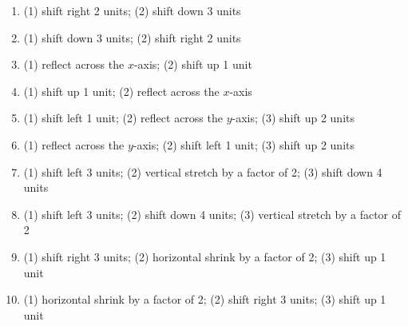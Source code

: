 \documentclass{ximera}
\begin{document}
\begin{enumerate}
\setcounter{enumi}{\value{HW}}


\item  (1) shift right 2 units; (2) shift down 3 units

\item  (1) shift down 3 units; (2) shift right 2 units

\item  (1) reflect across the $x$-axis; (2) shift up 1 unit

\item  (1) shift up 1 unit; (2) reflect across the $x$-axis

\item  (1) shift left 1 unit; (2) reflect across the $y$-axis; (3) shift up 2 units

\item  (1) reflect across the $y$-axis;  (2) shift left 1 unit;  (3) shift up 2 units

\item  (1) shift left 3 units; (2) vertical stretch by a factor of 2; (3) shift down 4 units

\item  (1) shift left 3 units; (2) shift down 4 units; (3) vertical stretch by a factor of 2

\item  (1) shift right 3 units; (2) horizontal shrink by a factor of 2; (3) shift up 1 unit

\item  (1) horizontal shrink by a factor of 2; (2) shift right 3 units; (3) shift up 1 unit


\setcounter{HW}{\value{enumi}}
\end{enumerate}


\newpage
\end{document}
